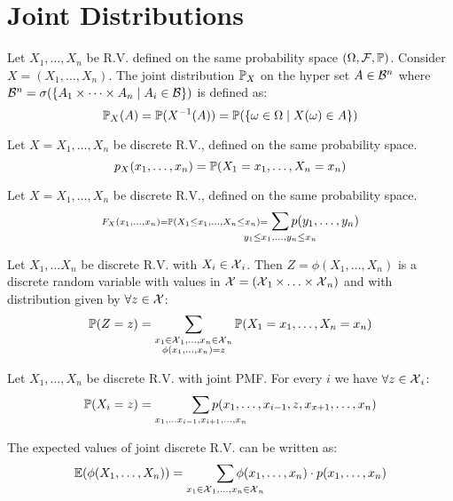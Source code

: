 \section{Joint Distributions}
\begin{definition*}
  Let \(X_1, \ldots, X_n\) be R.V. defined on the same probability space \((\O, \F, \P)\). Consider \(X = (X_1, \ldots, X_n)\). The joint distribution \(\P_X\) on the hyper set \(A \in \B^n\) where \(\B^n = \sigma(\{A_1 \times \cdots \times A_n \mid A_i \in \B\})\) is defined as:
  \[\P_X(A) = \P(X^{-1}(A)) = \P(\{\omega \in \O \mid X(\omega) \in A\})\]
\end{definition*}

\begin{ddefinition*}
  Let \(X = X_1, \ldots, X_n\) be discrete R.V., defined on the same probability space.
  \[p_{X}(x_1, \ldots, x_n) = \P(X_1 = x_1, \ldots, X_n = x_n)\]
\end{ddefinition*}

\begin{ddefinition*}
  Let \(X = X_1, \ldots, X_n\) be discrete R.V., defined on the same probability space.
  \[\scriptstyle F_X(x_1, \ldots, x_n) = \P(X_1 \leq x_1, \ldots, X_n \leq x_n) = \smashoperator{\sum_{y_1 \leq x_1, \ldots, y_n \leq x_n}} p(y_1, \ldots, y_n)\]
\end{ddefinition*}

\begin{proposition}
  Let \(X_1, \ldots X_n\) be discrete R.V. with \(X_i \in \DX_i\). Then \(Z = \phi(X_1, \ldots, X_n)\) is a discrete random variable with values in \(\DX = (\DX_1 \times \ldots \times \DX_n)\) and with distribution given by \(\forall z \in \DX\):
  \[\P(Z = z) = \sum_{\substack{x_1 \in \DX_1, \ldots, x_n \in \DX_n \\ \phi(x_1, \ldots, x_n) = z}} \P(X_1 = x_1, \ldots, X_n = x_n)\]
\end{proposition}

\begin{dtheorem*}
  Let \(X_1, \ldots, X_n\) be discrete R.V. with joint PMF. For every \(i\) we have \(\forall z \in \DX_i\):
  \[\P(X_i = z) = \smashoperator[r]{\sum_{x_1, \ldots x_{i-1}, x_{i+1}, \ldots, x_n}} p(x_1, \ldots, x_{i-1}, z, x_{x+1}, \ldots, x_n)\]
\end{dtheorem*}

\begin{proposition}
  The expected values of joint discrete R.V. can be written as:
  \[\E(\phi(X_1, \ldots, X_n)) = \smashoperator[r]{\sum_{x_1 \in \DX_1, \ldots, x_n \in \DX_n}} \phi(x_1, \ldots, x_n) \cdot p(x_1, \ldots, x_n)\]
\end{proposition}

